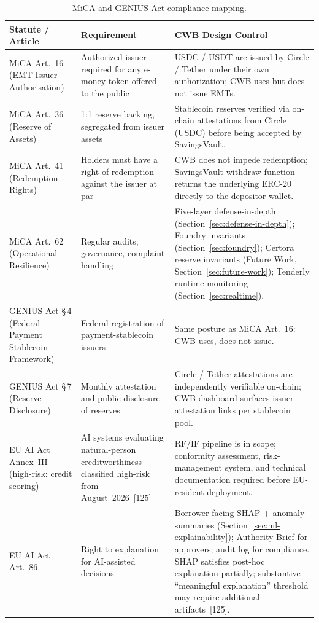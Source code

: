 \documentclass[12pt,a4paper]{report}
\newcommand{\tableheadcolor}{\rowcolor{TableHeadBg}}
\begin{document}
\begin{table}[H]
\centering
\caption[MiCA and GENIUS Act compliance mapping]{MiCA and GENIUS Act compliance mapping.}
\label{tab:mica-mapping}
\begin{tabular}{p{3.2cm}p{4.6cm}p{5.8cm}}
\toprule
\tableheadcolor
\textbf{Statute / Article} & \textbf{Requirement} & \textbf{CWB Design Control} \\
\midrule
MiCA Art.~16 (EMT Issuer Authorisation) & Authorized issuer required for any e-money token offered to the public & USDC / USDT are issued by Circle / Tether under their own authorization; CWB uses but does not issue EMTs. \\
MiCA Art.~36 (Reserve of Assets) & 1{:}1 reserve backing, segregated from issuer assets & Stablecoin reserves verified via on-chain attestations from Circle (USDC) before being accepted by SavingsVault. \\
MiCA Art.~41 (Redemption Rights) & Holders must have a right of redemption against the issuer at par & CWB does not impede redemption; SavingsVault withdraw function returns the underlying ERC-20 directly to the depositor wallet. \\
MiCA Art.~62 (Operational Resilience) & Regular audits, governance, complaint handling & Five-layer defense-in-depth (Section~\ref{sec:defense-in-depth}); Foundry invariants (Section~\ref{sec:foundry}); Certora reserve invariants (Future Work, Section~\ref{sec:future-work}); Tenderly runtime monitoring (Section~\ref{sec:realtime}). \\
GENIUS Act \S\,4 (Federal Payment Stablecoin Framework) & Federal registration of payment-stablecoin issuers & Same posture as MiCA Art.~16: CWB uses, does not issue. \\
GENIUS Act \S\,7 (Reserve Disclosure) & Monthly attestation and public disclosure of reserves & Circle / Tether attestations are independently verifiable on-chain; CWB dashboard surfaces issuer attestation links per stablecoin pool. \\
EU AI Act Annex~III (high-risk: credit scoring) & AI systems evaluating natural-person creditworthiness classified high-risk from August~2026~[125] & RF/IF pipeline is in scope; conformity assessment, risk-management system, and technical documentation required before EU-resident deployment. \\
EU AI Act Art.~86 & Right to explanation for AI-assisted decisions & Borrower-facing SHAP + anomaly summaries (Section~\ref{sec:ml-explainability}); Authority Brief for approvers; audit log for compliance. SHAP satisfies post-hoc explanation partially; substantive ``meaningful explanation'' threshold may require additional artifacts~[125]. \\

\end{tabular}
\end{table}
\end{document}
